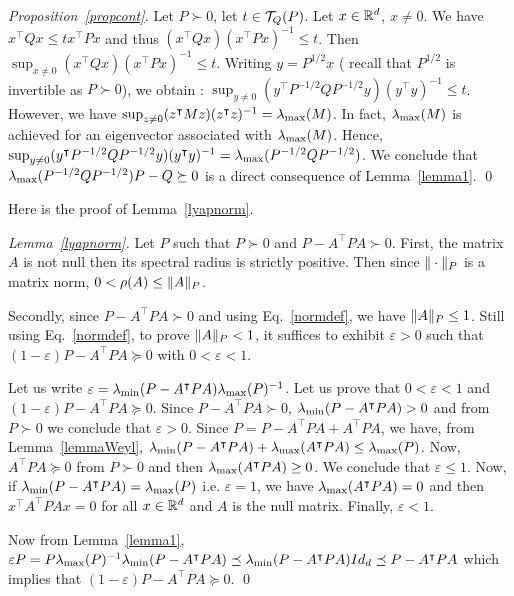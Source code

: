 \documentclass[10pt]{llncs}
\begin{document}
\begin{proof}[Proposition~\ref{propcont}]
Let $P\succ 0$, let $t\in\mathcal{T}_{Q}(P)$. Let $x\in\mathbb R^d$, $x\neq 0$. We have 
$x^\intercal Q x\leq t x^\intercal P x$ and thus $(x^\intercal Q x)(x^\intercal P x)^{-1}\leq t$. Then 
$\sup_{x\neq 0}(x^\intercal Q x)(x^\intercal P x)^{-1}\leq t $. Writing $y=P^{1/2}x$ ( recall that $P^{1/2}$ is invertible as $P\succ 0$), we obtain :
$\sup_{y\neq 0}(y^\intercal P^{-1/2}Q P^{-1/2}y)(y^\intercal y)^{-1}\leq t $. However, we have
$\sup_{z\neq 0} (z^\intercal M z)(z^\intercal z)^{-1}=\lambda_{\operatorname{max}}(M)$. In fact, $\lambda_{\operatorname{max}}(M)$ is achieved for an eigenvector associated with $\lambda_{\operatorname{max}}(M)$. Hence, 
$\sup_{y\neq 0} (y^\intercal P^{-1/2}Q P^{-1/2}y)(y^\intercal y)^{-1}=\lambda_{\operatorname{max}}(P^{-1/2} Q P^{-1/2})$. We conclude that $\lambda_{\operatorname{max}}(P^{-1/2} Q P^{-1/2})P-Q\succeq 0$ is a direct consequence of Lemma~\ref{lemma1}. 
\qed
\end{proof}

Here is the proof of Lemma~\ref{lyapnorm}.

\begin{proof}[Lemma~\ref{lyapnorm}]
Let $P$ such that $P\succ 0$ and $P-A^\intercal P A\succ 0$.  First, the matrix $A$ is not null then its spectral radius is strictly positive. Then since $\| \cdot\|_P$ is a matrix norm, $0<\rho(A) \leq \| A\|_P$.

Secondly, since $P-A^\intercal P A\succ 0$ and using Eq.~\eqref{normdef}, we have $\| A\|_P\leq 1$. Still using Eq.~\eqref{normdef}, to prove $\| A\|_P<1$, it suffices to exhibit $\varepsilon>0$ such that $(1-\varepsilon) P-A^\intercal P A\succeq 0$ with $0<\varepsilon<1$. 

Let us write $\varepsilon=\lambda_{\operatorname{min}}(P-A^\intercal P A) \lambda_{\operatorname{max}}(P)^{-1}$. Let us prove that $0<\varepsilon<1$ and $(1-\varepsilon) P-A^\intercal P A\succeq 0$.  Since $P-A^\intercal P A\succ 0$, $\lambda_{\operatorname{min}}(P-A^\intercal P A)>0$ and from $P\succ 0$ we conclude that $\varepsilon >0$. Since $P=P-A^ \intercal P A +A^\intercal P A$, we have, from Lemma~\ref{lemmaWeyl}, $\lambda_{\operatorname{min}}(P-A^\intercal P A)+\lambda_{\operatorname{max}}(A^\intercal P A)\leq \lambda_{\operatorname{max}}(P)$. Now, $A^\intercal P A\succeq 0$ from $P\succ 0$ and then $\lambda_{\operatorname{max}}(A^\intercal P A)\geq 0$. We conclude that $\varepsilon\leq 1$. Now, if $\lambda_{\operatorname{min}}(P-A^\intercal P A)=\lambda_{\operatorname{max}}(P)$ i.e. $\varepsilon=1$, we have 
$\lambda_{\operatorname{max}}(A^\intercal P A)=0$ and then $x^\intercal A^\intercal P A x=0$ for all $x\in \mathbb R^d$ and $A$ is the null matrix. 
Finally, $\varepsilon<1$. 

Now from Lemma~\ref{lemma1}, $\varepsilon P=P\lambda_{\operatorname{max}}(P)^{-1}\lambda_{\operatorname{min}}(P-A^\intercal P A)\preceq \lambda_{\operatorname{min}}(P-A^\intercal P A)Id_d\preceq 
P-A^\intercal P A$ which implies that $(1-\varepsilon) P -A^\intercal P A\succeq 0$. \qed
\end{proof}
\end{document}
